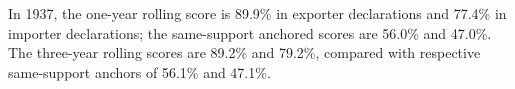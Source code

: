 In 1937, the one-year rolling score is 89.9\% in exporter declarations and 77.4\% in importer declarations; the same-support anchored scores are 56.0\% and 47.0\%. The three-year rolling scores are 89.2\% and 79.2\%, compared with respective same-support anchors of 56.1\% and 47.1\%.
